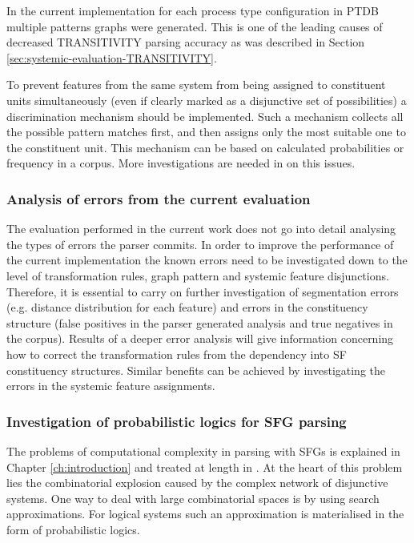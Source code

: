     In the current implementation for each process type configuration in PTDB multiple patterns graphs were generated. This is one of the leading causes of decreased TRANSITIVITY parsing accuracy as was described in Section \ref{sec:systemic-evaluation-TRANSITIVITY}.
    
    To prevent features from the same system from being assigned to constituent units simultaneously (even if clearly marked as a disjunctive set of possibilities) a discrimination mechanism should be implemented. Such a mechanism collects all the possible pattern matches first, and then assigns only the most suitable one to the constituent unit. This mechanism can be based on calculated probabilities or frequency in a corpus. More investigations are needed in on this issues. 

\subsubsection{Analysis of errors from the current evaluation}     
    
    The evaluation performed in the current work does not go into detail analysing the types of errors the parser commits. In order to improve the performance of the current implementation the known errors need to be investigated down to the level of transformation rules, graph pattern and systemic feature disjunctions. Therefore, it is essential to carry on further investigation of segmentation errors (e.g. distance distribution for each feature) and errors in the constituency structure (false positives in the parser generated analysis and true negatives in the corpus). Results of a deeper error analysis will give information concerning how to correct the transformation rules from the dependency into SF constituency structures. Similar benefits can be achieved by investigating the errors in the systemic feature assignments.

\subsubsection{Investigation of probabilistic logics for SFG parsing}
    
    The problems of computational complexity in parsing with SFGs is explained in Chapter \ref{ch:introduction} and treated at length in \citet{Bateman2008}. At the heart of this problem lies the combinatorial explosion caused by the complex network of disjunctive systems. One way to deal with large combinatorial spaces is by using search approximations. For logical systems such an approximation is materialised in the form of probabilistic logics.
    
